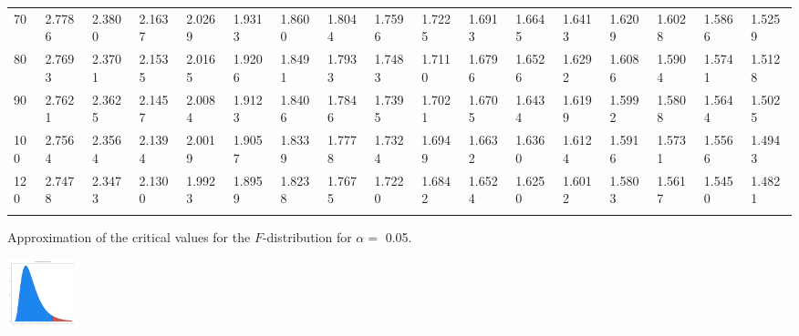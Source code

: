 {\begin{tabular}{|m{8pt}|m{18pt}*{15}{m{18pt}}}
 70 & 2.7786 & 2.3800 & 2.1637 & 2.0269 & 1.9313 & 1.8600 & 1.8044 & 1.7596 & 1.7225 & 1.6913 & 1.6645 & 1.6413 & 1.6209 & 1.6028 & 1.5866 & 1.5259 \\[2pt] \arrayrulecolor{light-gray}\hline\arrayrulecolor{black}  
 80 & 2.7693 & 2.3701 & 2.1535 & 2.0165 & 1.9206 & 1.8491 & 1.7933 & 1.7483 & 1.7110 & 1.6796 & 1.6526 & 1.6292 & 1.6086 & 1.5904 & 1.5741 & 1.5128 \\[2pt] \arrayrulecolor{light-gray}\hline\arrayrulecolor{black}  
 90 & 2.7621 & 2.3625 & 2.1457 & 2.0084 & 1.9123 & 1.8406 & 1.7846 & 1.7395 & 1.7021 & 1.6705 & 1.6434 & 1.6199 & 1.5992 & 1.5808 & 1.5644 & 1.5025 \\[2pt] \arrayrulecolor{light-gray}\hline\arrayrulecolor{black}  
100 & 2.7564 & 2.3564 & 2.1394 & 2.0019 & 1.9057 & 1.8339 & 1.7778 & 1.7324 & 1.6949 & 1.6632 & 1.6360 & 1.6124 & 1.5916 & 1.5731 & 1.5566 & 1.4943 \\[2pt] \arrayrulecolor{light-gray}\hline\arrayrulecolor{black}  
120 & 2.7478 & 2.3473 & 2.1300 & 1.9923 & 1.8959 & 1.8238 & 1.7675 & 1.7220 & 1.6842 & 1.6524 & 1.6250 & 1.6012 & 1.5803 & 1.5617 & 1.5450 & 1.4821 \\[2pt] \arrayrulecolor{light-gray}\hline\arrayrulecolor{black}  
\end{tabular}}
\clearpage

Approximation of the critical values for the $F$-distribution for
$\alpha=$ 0.05. 

 \includegraphics[height=2.0cm]{img/FDistribution}

